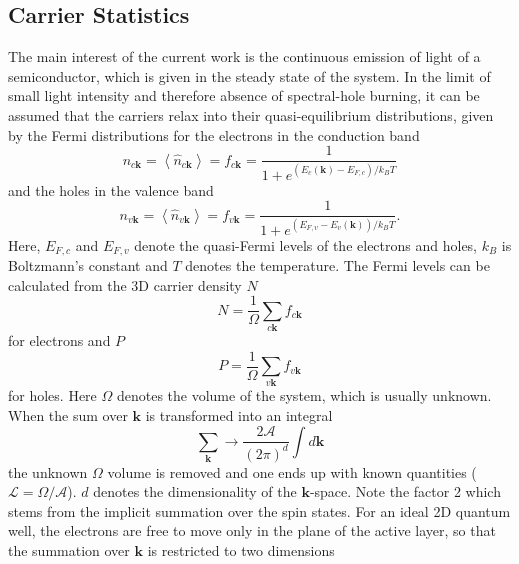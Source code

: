 \subsection{\label{sub:Carrier_Statistics}Carrier Statistics}

The main interest of the current work is the continuous emission of
light of a semiconductor, which is given in the steady state of the
system. In the limit of small light intensity and therefore absence
of spectral-hole burning, it can be assumed that the carriers relax
into their quasi-equilibrium distributions, given by the Fermi distributions
for the electrons in the conduction band\begin{equation}
n_{c\mathbf{k}}=\left\langle \hat{n}_{c\mathbf{k}}\right\rangle =f_{c\mathbf{k}}=\frac{1}{1+e^{\left(E_{c}(\mathbf{k})-E_{F,c}\right)/k_{B}T}}\label{eq:Conduction_Band_Electrons_Fermi}\end{equation}
and the holes in the valence band\begin{equation}
n_{v\mathbf{k}}=\left\langle \hat{n}_{v\mathbf{k}}\right\rangle =f_{v\mathbf{k}}=\frac{1}{1+e^{\left(E_{F,v}-E_{v}(\mathbf{k})\right)/k_{B}T}}.\label{eq:Valence_Band_Hole_Fermi}\end{equation}
Here, $E_{F,c}$ and $E_{F,v}$ denote the quasi-Fermi levels of the
electrons and holes, $k_{B}$ is Boltzmann\textquoteright{}s constant
and $T$ denotes the temperature. The Fermi levels can be calculated
from the 3D carrier density $N$\begin{equation}
N=\frac{1}{\Omega}\sum_{c\mathbf{k}}f_{c\mathbf{k}}\label{eq:Electron_3D_Density}\end{equation}
for electrons and $P$\begin{equation}
P=\frac{1}{\Omega}\sum_{v\mathbf{k}}f_{v\mathbf{k}}\label{eq:Holes_3D_Density}\end{equation}
for holes. Here $\Omega$ denotes the volume of the system, which
is usually unknown. When the sum over $\mathbf{k}$ is transformed
into an integral\begin{equation}
\sum_{\mathbf{k}}\rightarrow\frac{2\mathcal{A}}{(2\pi)^{d}}\int d\mathbf{k}\end{equation}
the unknown $\Omega$ volume is removed and one ends up with known
quantities ($\mathcal{L}=\Omega/\mathcal{A}$). $d$ denotes the dimensionality
of the $\mathbf{k}$-space. Note the factor 2 which stems from the
implicit summation over the spin states. For an ideal 2D quantum well,
the electrons are free to move only in the plane of the active layer,
so that the summation over $\mathbf{k}$ is restricted to two dimensions
